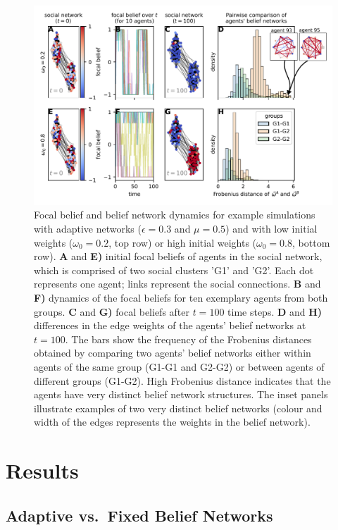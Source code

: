 \begin{figure}[t]
    \centering
    \includegraphics[width=0.8\linewidth]{figures/dynamics_adaptiveNB+inset.pdf}
    \caption{Focal belief and belief network dynamics for example simulations with adaptive networks ($\epsilon=0.3$ and $\mu=0.5$) and with low initial weights ($\omega_0=0.2$, top row) or high initial weights ($\omega_0 = 0.8$, bottom row). \textbf{A} and \textbf{E)} initial focal beliefs of agents in the social network, which is comprised of two social clusters 'G1' and 'G2'. Each dot represents one agent; links represent the social connections. \textbf{B} and \textbf{F)} dynamics of the focal beliefs for ten exemplary agents from both groups. \textbf{C} and \textbf{G)} focal beliefs after $t=100$ time steps. \textbf{D} and \textbf{H)} differences in the edge weights of the agents' belief networks at $t=100$. The bars show the frequency of the Frobenius distances obtained by comparing two agents' belief networks either within agents of the same group (G1-G1 and G2-G2) or between agents of different groups (G1-G2). High Frobenius distance indicates that the agents have very distinct belief network structures. The inset panels illustrate examples of two very distinct belief networks (colour and width of the edges represents the weights in the belief network).}
    \label{fig:res1}
\end{figure}

\section*{Results} 

\subsection*{Adaptive vs.~Fixed Belief Networks}

